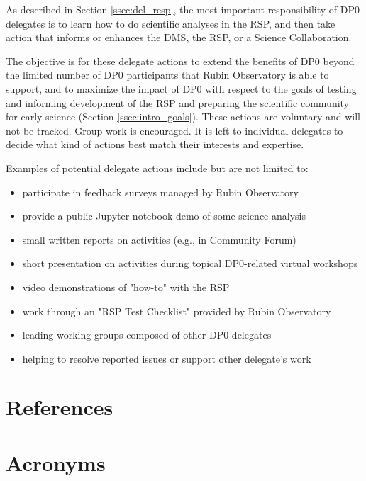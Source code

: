 \documentclass[DM,lsstdraft,authoryear,toc]{lsstdoc}
\begin{document}
As described in Section \ref{ssec:del_resp}, the most important responsibility of DP0 delegates is to learn how to do scientific analyses in the RSP, and then take action that informs or enhances the DMS, the RSP, or a Science Collaboration. 

The objective is for these delegate actions to extend the benefits of DP0 beyond the limited number of DP0 participants that Rubin Observatory is able to support, and to maximize the impact of DP0 with respect to the goals of testing and informing development of the RSP and preparing the scientific community for early science (Section \ref{ssec:intro_goals}). 
These actions are voluntary and will not be tracked.
Group work is encouraged.
It is left to individual delegates to decide what kind of actions best match their interests and expertise. 

Examples of potential delegate actions include but are not limited to:
\begin{itemize}
\item participate in feedback surveys managed by Rubin Observatory
\item provide a public Jupyter notebook demo of some science analysis
\item small written reports on activities (e.g., in Community Forum)
\item short presentation on activities during topical DP0-related virtual workshops
\item video demonstrations of "how-to" with the RSP
\item work through an "RSP Test Checklist" provided by Rubin Observatory
\item leading working groups composed of other DP0 delegates
\item helping to resolve reported issues or support other delegate's work
\end{itemize}


\appendix
\section{References} \label{sec:bib}
\renewcommand{\refname}{} %


\section{Acronyms}



% 
\end{document}
